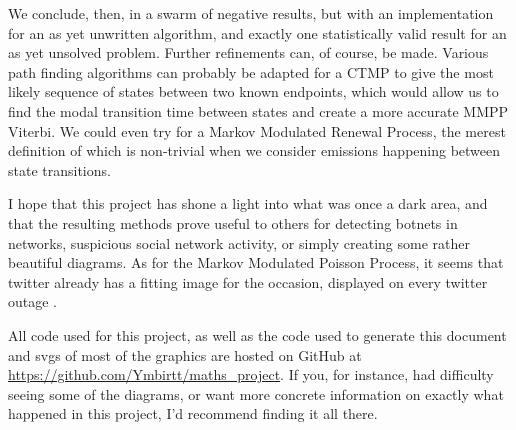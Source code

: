 We conclude, then, in a swarm of negative results, but with an implementation for an as yet unwritten algorithm, and exactly one statistically valid result for an as yet unsolved problem. Further refinements can, of course, be made. Various path finding algorithms can probably be adapted for a CTMP to give the most likely sequence of states between two known endpoints, which would allow us to find the modal transition time between states and create a more accurate MMPP Viterbi. We could even try for a Markov Modulated Renewal Process, the merest definition of which is non-trivial when we consider emissions happening between state transitions.

I hope that this project has shone a light into what was once a dark area, and that the resulting methods prove useful to others for detecting botnets in networks, suspicious social network activity, or simply creating some rather beautiful diagrams. As for the Markov Modulated Poisson Process, it seems that twitter already has a fitting image for the occasion, displayed on every twitter outage \cite{fail_whale}.

All code used for this project, as well as the code used to generate this document and svgs of most of the graphics are hosted on GitHub at \url{https://github.com/Ymbirtt/maths_project}. If you, for instance, had difficulty seeing some of the diagrams, or want more concrete information on exactly what happened in this project, I'd recommend finding it all there.